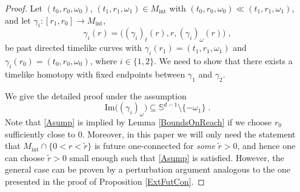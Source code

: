 \documentclass[reqno]{article}
\newcommand{\Sd}{\mathbb{S}^{d-1}}
\newcommand{\Mint}{M_{\mathrm{int}}}
\begin{document}
\begin{proof}
Let $(t_0, r_0, \omega_0)$, $(t_1, r_1, \omega_1) \in \Mint$ with $(t_0, r_0, \omega_0) \ll (t_1, r_1, \omega_1)$, and let $\gamma_i : [r_1, r_0] \to \Mint$, 
\begin{equation*}
\gamma_i(r) = \big( (\gamma_i)_t(r) , r, (\gamma_i)_\omega(r) \big)\;,
\end{equation*}
be past directed timelike curves with $\gamma_i (r_1) = (t_1, r_1, \omega_1)$ and $\gamma_i(r_0) = (t_0, r_0, \omega_0)$, where $i \in  \{1,2\}$. We need to show that there exists a timelike homotopy with fixed endpoints between $\gamma_1$ and $\gamma_2$.

We give the detailed proof under the assumption
\begin{equation}
\label{Asump}
\mathrm{Im}\big((\gamma_i)_\omega\big) \subseteq \Sd \setminus \{ - \omega_1\}\;.
\end{equation} 
Note that \eqref{Asump} is implied by Lemma \ref{BoundsOnReach} if we choose $r_0$ sufficiently close to $0$. Moreover, in this paper we will only need the statement that $\Mint \cap \{ 0 < r < \tilde{r}\}$ is future one-connected for \emph{some} $\tilde{r} >0$, and hence one can choose $\tilde{r} >0$ small enough such that \eqref{Asump} is satisfied. However, the general case can be proven by a perturbation argument analogous to the one presented in the proof of Proposition \ref{ExtFutCon}.


\end{proof}
\end{document}
